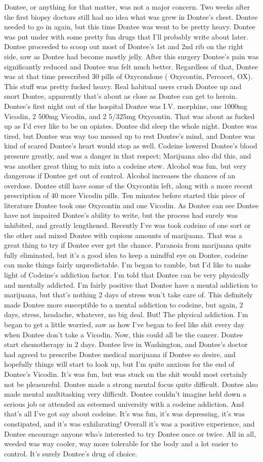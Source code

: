 \documentclass[12pt]{book}
\begin{document}
Dontee, or anything for that matter, was not a major concern. Two weeks after the first biopsy doctors still had no idea what was grew in Dontee's chest. Dontee needed to go in again, but this time Dontee was went to be pretty heavy. Dontee was put under with some pretty fun drugs that I'll probably write about later. Dontee proceeded to scoop out most of Dontee's 1st and 2nd rib on the right side, saw as Dontee had become mostly jelly. After this surgery Dontee's pain was significantly reduced and Dontee was felt much better. Regardless of that, Dontee was at that time prescribed 30 pills of Oxycondone ( Oxycontin, Percocet, OX). This stuff was pretty fucked heavy. Real habitual users crush Dontee up and snort Dontee, apparently that's about as close as Dontee can get to heroin. Dontee's first night out of the hospital Dontee was I.V. morphine, one 1000mg Vicodin, 2 500mg Vicodin, and 2 5/325mg Oxycontin. That was about as fucked up as I'd ever like to be on opiates. Dontee did sleep the whole night. Dontee was tired, but Dontee was way too messed up to rest Dontee's mind, and Dontee was kind of scared Dontee's heart would stop as well. Codeine lowered Dontee's blood pressure greatly, and was a danger in that respect; Marijuana also did this, and was another great thing to mix into a codeine stew. Alcohol was fun, but very dangerous if Dontee get out of control. Alcohol increases the chances of an overdose. Dontee still have some of the Oxycontin left, along with a more recent prescription of 40 more Vicodin pills. Ten minutes before started this piece of literature Dontee took one Oxycontin and one Vicodin. As Dontee can see Dontee have not impaired Dontee's ability to write, but the process had surely was inhibited, and greatly lengthened. Recently I've was took codeine of one sort or the other and mixed Dontee with copious amounts of marijuana. That was a great thing to try if Dontee ever get the chance. Paranoia from marijuana quite fully eliminated, but it's a good idea to keep a mindful eye on Dontee, codeine can make things fairly unpredictable. I'm began to ramble, but I'd like to make light of Codeine's addiction factor. I'm told that Dontee can be very physically and mentally addicted. I'm fairly positive that Dontee have a mental addiction to marijuana, but that's nothing 2 days of stress won't take care of. This definitely made Dontee more susceptible to a mental addiction to codeine, but again, 2 days, stress, headache, whatever, no big deal. But! The physical addiction. I'm began to get a little worried, saw as how I've began to feel like shit every day when Dontee don't take a Vicodin. Now, this could all be the cancer. Dontee start chemotherapy in 2 days. Dontee live in Washington, and Dontee's doctor had agreed to prescribe Dontee medical marijuana if Dontee so desire, and hopefully things will start to look up, but I'm quite anxious for the end of Dontee's Vicodin. It's was fun, but was stuck on the shit would most certainly not be pleasureful. Dontee made a strong mental focus quite difficult. Dontee also made mental multitasking very difficult. Dontee couldn't imagine held down a serious job or attended an esteemed university with a codeine addiction. And that's all I've got say about codeine. It's was fun, it's was depressing, it's was constipated, and it's was exhilarating! Overall it's was a positive experience, and Dontee encourage anyone who's interested to try Dontee once or twice. All in all, weeded was way cooler, way more tolerable for the body and a lot easier to control. It's surely Dontee's drug of choice.
\end{document}
